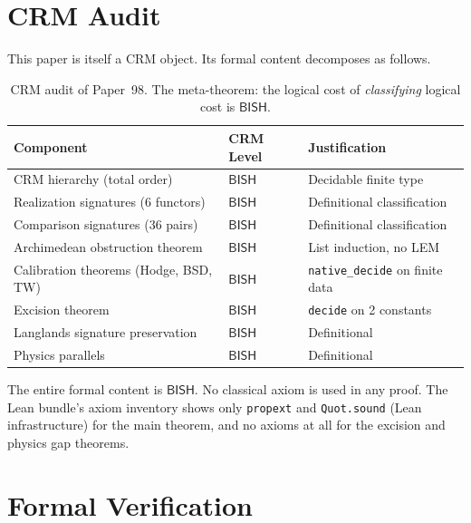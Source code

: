 \documentclass[11pt,a4paper]{article}
\theoremstyle{plain}
\theoremstyle{definition}
\newcommand{\BISH}{\textsf{BISH}}
\begin{document}
\section{CRM Audit}\label{sec:audit}

This paper is itself a CRM object. Its formal content decomposes as follows.

\begin{table}[ht]
\centering
\begin{tabular}{@{}lll@{}}
\toprule
\textbf{Component} & \textbf{CRM Level} & \textbf{Justification} \\
\midrule
CRM hierarchy (total order) & $\BISH$ & Decidable finite type \\
Realization signatures (6 functors) & $\BISH$ & Definitional classification \\
Comparison signatures (36 pairs) & $\BISH$ & Definitional classification \\
Archimedean obstruction theorem & $\BISH$ & List induction, no LEM \\
Calibration theorems (Hodge, BSD, TW) & $\BISH$ & \texttt{native\_decide} on finite data \\
Excision theorem & $\BISH$ & \texttt{decide} on 2 constants \\
Langlands signature preservation & $\BISH$ & Definitional \\
Physics parallels & $\BISH$ & Definitional \\
\bottomrule
\end{tabular}
\caption{CRM audit of Paper~98. The meta-theorem: the logical cost of \emph{classifying} logical cost is $\BISH$.}
\label{tab:audit}
\end{table}

The entire formal content is $\BISH$. No classical axiom is used in any proof. The Lean bundle's axiom inventory shows only \texttt{propext} and \texttt{Quot.sound} (Lean infrastructure) for the main theorem, and no axioms at all for the excision and physics gap theorems.

\section{Formal Verification}\label{sec:formal}
\end{document}
